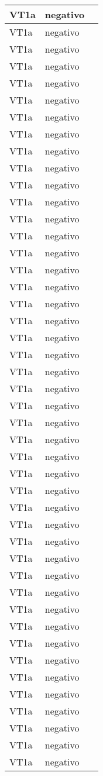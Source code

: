 \begin{center}
\begin{tabular}{|p{2cm}|p{4cm}|p{5cm}|}
VT1a & negativo & \\ \hline
VT1a & negativo & \\ \hline
VT1a & negativo & \\ \hline
VT1a & negativo & \\ \hline
VT1a & negativo & \\ \hline
VT1a & negativo & \\ \hline
VT1a & negativo & \\ \hline
VT1a & negativo & \\ \hline
VT1a & negativo & \\ \hline
VT1a & negativo & \\ \hline
VT1a & negativo & \\ \hline
VT1a & negativo & \\ \hline
VT1a & negativo & \\ \hline
VT1a & negativo & \\ \hline
VT1a & negativo & \\ \hline
VT1a & negativo & \\ \hline
VT1a & negativo & \\ \hline
VT1a & negativo & \\ \hline
VT1a & negativo & \\ \hline
VT1a & negativo & \\ \hline
VT1a & negativo & \\ \hline
VT1a & negativo & \\ \hline
VT1a & negativo & \\ \hline
VT1a & negativo & \\ \hline
VT1a & negativo & \\ \hline
VT1a & negativo & \\ \hline
VT1a & negativo & \\ \hline
VT1a & negativo & \\ \hline
VT1a & negativo & \\ \hline
VT1a & negativo & \\ \hline
VT1a & negativo & \\ \hline
VT1a & negativo & \\ \hline
VT1a & negativo & \\ \hline
VT1a & negativo & \\ \hline
VT1a & negativo & \\ \hline
VT1a & negativo & \\ \hline
VT1a & negativo & \\ \hline
VT1a & negativo & \\ \hline
VT1a & negativo & \\ \hline
VT1a & negativo & \\ \hline
VT1a & negativo & \\ \hline
VT1a & negativo & \\ \hline
VT1a & negativo & \\ \hline
VT1a & negativo & \\ \hline
VT1a & negativo & \\ \hline



\end{tabular} \\
\end{center}

